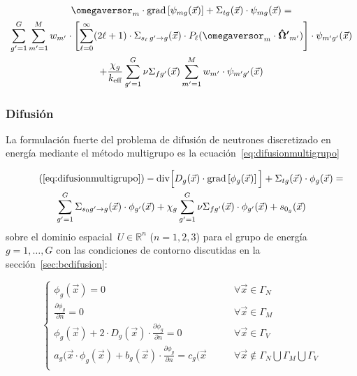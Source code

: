 \begin{multline}\label{eq:transportesnkeff}
 \omegaversor_m \cdot \text{grad} \left[ \psi_{mg}(\vec{x}) \right]
 + \Sigma_{t g}(\vec{x}) \cdot \psi_{mg}(\vec{x}) = \\
  \sum_{g^\prime=1}^G \sum_{m^\prime=1}^M w_{m^\prime} \cdot
\left[  \sum_{\ell=0}^\infty (2\ell+1) \cdot \Sigma_{s_\ell \,g^\prime \rightarrow g}(\vec{x}) \cdot P_\ell (\omegaversor_m \cdot \boldsymbol{\hat{\Omega}^\prime}_{m^\prime}) \right]
 \cdot \psi_{m^\prime g^\prime}(\vec{x}) \\
+ \frac{\chi_g}{k_\text{eff}} \sum_{g^\prime=1}^G \nu\Sigma_{fg^\prime}(\vec{x}) \sum_{m^\prime=1}^M w_{m^\prime} \cdot \psi_{m^\prime g^\prime}(\vec{x})
\end{multline}

\subsubsection{Difusión} %

La formulación fuerte del problema de difusión de neutrones discretizado en energía mediante el método multigrupo es la ecuación~\eqref{eq:difusionmultigrupo}

\begin{multline}\tag{\ref{eq:difusionmultigrupo}}
 - \text{div} \Big[ D_g(\vec{x}) \cdot \text{grad} \left[ \phi_g(\vec{x}) \right] \Big]
 + \Sigma_{t g}(\vec{x}) \cdot \phi_g(\vec{x})
 = \\
\sum_{g^\prime = 1}^G \Sigma_{s_0 g^\prime \rightarrow g}(\vec{x})  \cdot \phi_{g^\prime}(\vec{x}) +
\chi_g \sum_{g^\prime = 1}^G \nu\Sigma_{fg^\prime}(\vec{x}) \cdot \phi_{g^\prime}(\vec{x})+ s_{0_g}(\vec{x})
\end{multline}
%
sobre el dominio espacial~$U \in \mathbb{R}^n$ ($n=1,2,3$) para el grupo de energía~$g=1,\dots,G$ con las condiciones de contorno discutidas en la sección~\ref{sec:bcdifusion}:

\begin{equation}\label{eq:difusioncc}
 \begin{cases}
  \phi_g(\vec{x}) = 0 
&\quad\quad \forall \vec{x} \in \Gamma_N \\
  \displaystyle \frac{\partial \phi_g}{\partial n} = 0
&\quad\quad \forall \vec{x} \in \Gamma_M \\
  \phi_g(\vec{x}) + 2\cdot D_g(\vec{x}) \cdot \displaystyle \frac{\partial \phi_g}{\partial n} = 0
&\quad\quad \forall \vec{x} \in \Gamma_V \\
  a_g(\vec{x} \cdot \phi_g(\vec{x}) + b_g(\vec{x}) \cdot \displaystyle \frac{\partial \phi_g}{\partial n} = c_g(\vec{x}
&\quad\quad \forall \vec{x} \notin \Gamma_N \bigcup \Gamma_M \bigcup \Gamma_V \\
 \end{cases}
\end{equation}

